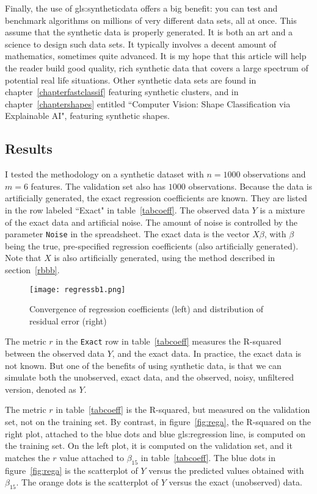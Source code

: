 \documentclass[oneside,10pt]{book}
\begin{document}
Finally, the use of \gls{gls:syntheticdata} offers a big benefit: you can test and benchmark algorithms on millions of very different data sets, all at once. This assume that the synthetic data is properly generated. It is both an art and a science to design such data sets. It typically involves a decent amount of mathematics, sometimes quite advanced. It is my hope that this article will help the reader build good quality, rich synthetic data that covers a large spectrum of potential real life situations. Other synthetic data sets are found in chapter~\ref{chapterfastclassif}
 featuring synthetic clusters, and in chapter~\ref{chaptershapes} entitled ``Computer Vision: Shape Classification via Explainable AI", featuring synthetic shapes.


\subsection{Results}\label{rres}

I tested the methodology on a synthetic dataset with $n=1000$ observations and $m=6$ features. The validation set also has $1000$ observations. Because the data is artificially generated, the exact regression coefficients are known. They are listed in the row labeled ``Exact" in table~\ref{tabcoeff}. The observed data $Y$ is a mixture of the exact data  and artificial noise. The amount of noise is controlled by the parameter \texttt{Noise} in the spreadsheet. 
The exact data is the vector $X\beta$, with $\beta$ being the true, pre-specified regression coefficients (also artificially generated). Note that $X$ is also artificially generated, using the method described in section~\ref{rbbb}.


\begin{figure}%
\centering
\texttt{[image: regressb1.png]} 
\caption{Convergence of regression coefficients (left) and distribution of residual error (right)}
\label{fig:regb}
\end{figure}

The metric $r$ in the \texttt{Exact} row in table~\ref{tabcoeff} measures the R-squared between the observed data $Y$, and the exact data. In practice, the exact data is not known. But one of the benefits of using synthetic data, is that we can simulate both the unobserved, exact data, and the observed, noisy, unfiltered version, denoted as $Y$.

The metric $r$ in table~\ref{tabcoeff} is the R-squared, but measured on the validation set, not on the training set. By contrast, 
in figure~\ref{fig:rega}, the R-squared on the right plot, attached to the blue dots and blue \gls{gls:regression} line,  is computed on the training set. On the left plot, it is computed on the validation set, and it matches the $r$ value attached to  $\beta_{15}$ in table~\ref{tabcoeff}. The blue dots in figure~\ref{fig:rega} is the scatterplot of $Y$ versus the predicted values obtained with $\beta_{15}$. The orange dots is the scatterplot of $Y$ versus the exact (unobserved) data.
\end{document}
